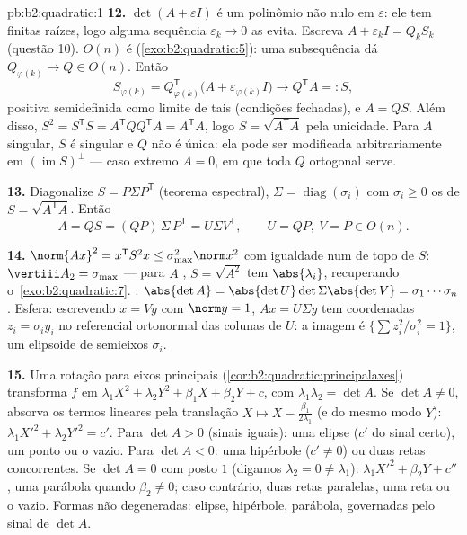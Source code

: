 \begin{solution}{pb:b2:quadratic:1}
\textbf{12.} $\det(A + \varepsilon I)$ é um polinômio não nulo
em $\varepsilon$: ele tem finitas raízes, logo alguma sequência
$\varepsilon_k \to 0$ as evita. Escreva $A + \varepsilon_kI =
Q_kS_k$ (questão 10). $O(n)$ é 
(\cref{exo:b2:quadratic:5}): uma subsequência dá $Q_{\varphi(k)}
\to Q \in O(n)$. Então
\[
S_{\varphi(k)} = Q_{\varphi(k)}^{\mathsf T}
\bigl(A + \varepsilon_{\varphi(k)}I\bigr)
\longrightarrow Q^{\mathsf T}A =: S,
\]
 positiva semidefinida como limite de tais (condições
fechadas), e $A = QS$. Além disso, $S^2 = S^{\mathsf T}S =
A^{\mathsf T}QQ^{\mathsf T}A = A^{\mathsf T}A$, logo $S =
\sqrt{A^{\mathsf T}A}$ pela unicidade. Para $A$ singular, $S$ é
singular e $Q$ não é única: ela pode ser modificada arbitrariamente
em $(\operatorname{im} S)^{\perp}$ --- caso extremo $A = 0$,
em que toda $Q$ ortogonal serve.

\textbf{13.} Diagonalize $S = P\Sigma P^{\mathsf T}$ (teorema
espectral), $\Sigma = \operatorname{diag}(\sigma_i)$ com
$\sigma_i \geq 0$ os  de $S =
\sqrt{A^{\mathsf T}A}$. Então
\[
A = QS = (QP)\,\Sigma\,P^{\mathsf T} = U\Sigma V^{\mathsf T},
\qquad U = QP,\ V = P \in O(n) .
\]

\textbf{14.} $\norm{Ax}^2 = x^{\mathsf T}S^2x \leq
\sigma_{\max}^2\norm x^2$ com igualdade num  de topo de
$S$: $\vertiii A_2 = \sigma_{\max}$ --- para $A$ ,
$S = \sqrt{A^2}$ tem  $\abs{\lambda_i}$, recuperando
o~\cref{exo:b2:quadratic:7}. : $\abs{\det A} =
\abs{\det U}\det\Sigma\abs{\det V} = \sigma_1\cdots\sigma_n$.
Esfera: escrevendo $x = Vy$ com $\norm y = 1$, $Ax = U\Sigma y$
tem coordenadas $z_i = \sigma_iy_i$ no referencial ortonormal das
colunas de $U$: a imagem é $\{\sum z_i^2/\sigma_i^2 =
1\}$, um elipsoide de semieixos $\sigma_i$.

\textbf{15.} Uma rotação para eixos principais
(\cref{cor:b2:quadratic:principalaxes}) transforma $f$ em
$\lambda_1X^2 + \lambda_2Y^2 + \beta_1X + \beta_2Y + c$, com
$\lambda_1\lambda_2 = \det A$. Se $\det A \neq 0$, absorva os
termos lineares pela translação $X \mapsto X -
\frac{\beta_1}{2\lambda_1}$ (e do mesmo modo $Y$): $\lambda_1X'^2
+ \lambda_2Y'^2 = c'$. Para $\det A > 0$ (sinais iguais): uma
elipse ($c'$ do sinal certo), um ponto ou o vazio. Para $\det
A < 0$: uma hipérbole ($c' \neq 0$) ou duas retas concorrentes. Se
$\det A = 0$ com posto $1$ (digamos $\lambda_2 = 0 \neq
\lambda_1$): $\lambda_1X'^2 + \beta_2Y + c''$, uma parábola quando
$\beta_2 \neq 0$; caso contrário, duas retas paralelas, uma reta ou o
vazio. Formas não degeneradas: elipse, hipérbole, parábola,
governadas pelo sinal de $\det A$.


\end{solution}
